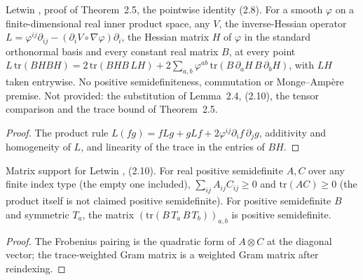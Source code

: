 \begin{lemma}
  \label{lem:letwin-hessian-trace}
  \leanok
  Letwin \cite{Letwin2026QuadraticKLS}, proof of Theorem~2.5, the pointwise identity (2.8).  For a smooth $\varphi$ on a
  finite-dimensional real inner product space, any $V$, the inverse-Hessian operator
  $L=\varphi^{ij}\partial_{ij}-(\partial_iV\circ\nabla\varphi)\partial_i$, the Hessian matrix $H$ of $\varphi$ in the standard
  orthonormal basis and every constant real matrix $B$, at every point
  $L\,\mathrm{tr}(BHBH)=2\,\mathrm{tr}(BHB\,LH)+2\sum_{a,b}\varphi^{ab}\,\mathrm{tr}(B\,\partial_aH\,B\,\partial_bH)$, with
  $LH$ taken entrywise.  No positive semidefiniteness, commutation or Monge--Amp\`ere premise.  Not provided: the
  substitution of Lemma~2.4, (2.10), the tensor comparison and the trace bound of Theorem~2.5.
\end{lemma}
\begin{proof}
  \leanok
  The product rule $L(fg)=fLg+gLf+2\varphi^{ij}\partial_if\,\partial_jg$, additivity and homogeneity of $L$, and
  linearity of the trace in the entries of $BH$.
\end{proof}

\begin{lemma}
  \label{lem:letwin-trace-gram-positivity}
  \leanok
  Matrix support for Letwin \cite{Letwin2026QuadraticKLS}, (2.10).  For real positive semidefinite $A,C$ over any finite
  index type (the empty one included), $\sum_{ij}A_{ij}C_{ij}\ge0$ and $\mathrm{tr}(AC)\ge0$ (the product itself is not claimed
  positive semidefinite).  For positive semidefinite $B$ and symmetric $T_a$, the matrix
  $(\mathrm{tr}(B\,T_a\,B\,T_b))_{a,b}$ is positive semidefinite.
\end{lemma}
\begin{proof}
  \leanok
  The Frobenius pairing is the quadratic form of $A\otimes C$ at the diagonal vector; the trace-weighted Gram matrix is a
  weighted Gram matrix after reindexing.
\end{proof}

